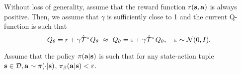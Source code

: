 \begin{assumption}
\label{assumption:magnitude}
Without loss of generality,
assume that the reward function $r(\mathbf{s}, \mathbf{a})$ is always positive. Then, we assume that $\gamma$ is sufficiently close to 1 and the current Q-function is such that 
\begin{equation*}
    Q_\theta = r + \gamma \hat{{\mathcal{T}}}^\pi Q_\theta  ~\approx~ Q_\theta = \varepsilon + \gamma \hat{{\mathcal{T}}}^\pi Q_\theta,~~~ \varepsilon \sim {\mathcal{N}}(0, I).
\end{equation*}
\end{assumption}

\begin{assumption}
\label{assumption:ood}
Assume that the policy $\pi(\mathbf{a}|\mathbf{s})$ is such that for any state-action tuple $\mathbf{s} \in \mathcal{D}, \mathbf{a} \sim \pi(\cdot|\mathbf{s})$, $\pi_\beta(\mathbf{a}|\mathbf{s}) < \varepsilon$.  
\end{assumption}

